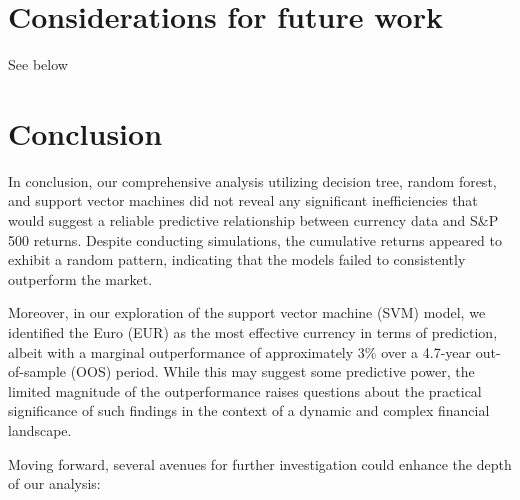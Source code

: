 \section{Considerations for future work}
\label{Considerations for future work}
See below

\section{Conclusion}
\label{Conclusion}
In conclusion, our comprehensive analysis utilizing decision tree, random forest, and support vector machines did not reveal any significant inefficiencies that would suggest a reliable predictive relationship between currency data and S\&P 500 returns. Despite conducting simulations, the cumulative returns appeared to exhibit a random pattern, indicating that the models failed to consistently outperform the market.

Moreover, in our exploration of the support vector machine (SVM) model, we identified the Euro (EUR) as the most effective currency in terms of prediction, albeit with a marginal outperformance of approximately 3\% over a 4.7-year out-of-sample (OOS) period. While this may suggest some predictive power, the limited magnitude of the outperformance raises questions about the practical significance of such findings in the context of a dynamic and complex financial landscape.

Moving forward, several avenues for further investigation could enhance the depth of our analysis:

